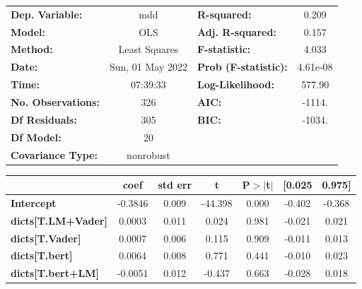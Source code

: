 \begin{center}
\begin{tabular}{lclc}
\toprule
\textbf{Dep. Variable:}              &       mdd        & \textbf{  R-squared:         } &     0.209   \\
\textbf{Model:}                      &       OLS        & \textbf{  Adj. R-squared:    } &     0.157   \\
\textbf{Method:}                     &  Least Squares   & \textbf{  F-statistic:       } &     4.033   \\
\textbf{Date:}                       & Sun, 01 May 2022 & \textbf{  Prob (F-statistic):} &  4.61e-08   \\
\textbf{Time:}                       &     07:39:33     & \textbf{  Log-Likelihood:    } &    577.90   \\
\textbf{No. Observations:}           &         326      & \textbf{  AIC:               } &    -1114.   \\
\textbf{Df Residuals:}               &         305      & \textbf{  BIC:               } &    -1034.   \\
\textbf{Df Model:}                   &          20      & \textbf{                     } &             \\
\textbf{Covariance Type:}            &    nonrobust     & \textbf{                     } &             \\
\bottomrule
\end{tabular}
\begin{tabular}{lcccccc}
                                     & \textbf{coef} & \textbf{std err} & \textbf{t} & \textbf{P$> |$t$|$} & \textbf{[0.025} & \textbf{0.975]}  \\
\midrule
\textbf{Intercept}                   &      -0.3846  &        0.009     &   -44.398  &         0.000        &       -0.402    &       -0.368     \\
\textbf{dicts[T.LM+Vader]}           &       0.0003  &        0.011     &     0.024  &         0.981        &       -0.021    &        0.021     \\
\textbf{dicts[T.Vader]}              &       0.0007  &        0.006     &     0.115  &         0.909        &       -0.011    &        0.013     \\
\textbf{dicts[T.bert]}               &       0.0064  &        0.008     &     0.771  &         0.441        &       -0.010    &        0.023     \\
\textbf{dicts[T.bert+LM]}            &      -0.0051  &        0.012     &    -0.437  &         0.663        &       -0.028    &        0.018     \\

\end{tabular}
\end{center}
